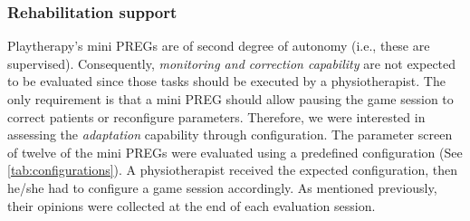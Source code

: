 \subsubsection{Rehabilitation support}
Playtherapy's mini \acp{PREG} are of second degree of autonomy (i.e., these are supervised). Consequently, \textit{monitoring and correction capability} are not expected to be evaluated since those tasks should be executed by a physiotherapist. The only requirement is that a mini \ac{PREG} should allow pausing the game session to correct patients or reconfigure parameters.
Therefore, we were interested in assessing the \textit{adaptation} capability through configuration. The parameter screen of twelve of the mini \acp{PREG} were evaluated using a predefined configuration (See \autoref{tab:configurations}). A physiotherapist received the expected configuration, then he/she had to configure a game session accordingly. As mentioned previously, their opinions were collected at the end of each evaluation session.

